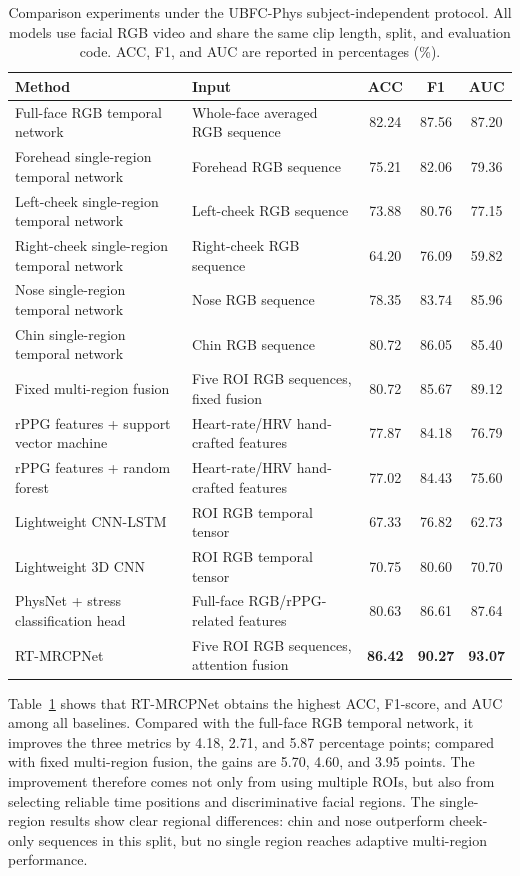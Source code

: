 \documentclass[runningheads]{llncs}
\begin{document}
\begin{table}[!htbp]
\caption{Comparison experiments under the UBFC-Phys subject-independent protocol. All models use facial RGB video and share the same clip length, split, and evaluation code. ACC, F1, and AUC are reported in percentages (\%).}
\label{tab:main_results}
\centering
\small
\begin{tabular}{p{3.9cm}p{4.45cm}ccc}
\toprule
Method & Input & ACC & F1 & AUC \\
\midrule
Full-face RGB temporal network & Whole-face averaged RGB sequence & 82.24 & 87.56 & 87.20 \\
\addlinespace[0.1em]
Forehead single-region temporal network & Forehead RGB sequence & 75.21 & 82.06 & 79.36 \\
Left-cheek single-region temporal network & Left-cheek RGB sequence & 73.88 & 80.76 & 77.15 \\
Right-cheek single-region temporal network & Right-cheek RGB sequence & 64.20 & 76.09 & 59.82 \\
Nose single-region temporal network & Nose RGB sequence & 78.35 & 83.74 & 85.96 \\
Chin single-region temporal network & Chin RGB sequence & 80.72 & 86.05 & 85.40 \\
\addlinespace[0.1em]
Fixed multi-region fusion & Five ROI RGB sequences, fixed fusion & 80.72 & 85.67 & 89.12 \\
\addlinespace[0.1em]
rPPG features + support vector machine & Heart-rate/HRV hand-crafted features & 77.87 & 84.18 & 76.79 \\
rPPG features + random forest & Heart-rate/HRV hand-crafted features & 77.02 & 84.43 & 75.60 \\
\addlinespace[0.1em]
Lightweight CNN-LSTM & ROI RGB temporal tensor & 67.33 & 76.82 & 62.73 \\
Lightweight 3D CNN & ROI RGB temporal tensor & 70.75 & 80.60 & 70.70 \\
\addlinespace[0.1em]
PhysNet + stress classification head & Full-face RGB/rPPG-related features & 80.63 & 86.61 & 87.64 \\
\addlinespace[0.1em]
RT-MRCPNet & Five ROI RGB sequences, attention fusion & \textbf{86.42} & \textbf{90.27} & \textbf{93.07} \\
\bottomrule
\end{tabular}
\end{table}


Table~\ref{tab:main_results} shows that RT-MRCPNet obtains the highest ACC, F1-score, and AUC among all baselines. Compared with the full-face RGB temporal network, it improves the three metrics by 4.18, 2.71, and 5.87 percentage points; compared with fixed multi-region fusion, the gains are 5.70, 4.60, and 3.95 points. The improvement therefore comes not only from using multiple ROIs, but also from selecting reliable time positions and discriminative facial regions. The single-region results show clear regional differences: chin and nose outperform cheek-only sequences in this split, but no single region reaches adaptive multi-region performance.
\end{document}
